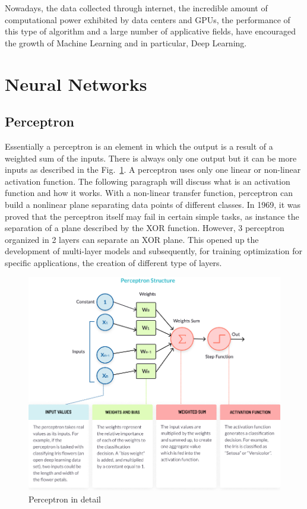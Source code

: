 \documentclass[12pt]{report}
\begin{document}
Nowadays, the data collected through internet, the incredible amount of computational power exhibited
by data centers and GPUs, the performance of this type of algorithm and a large number of applicative fields,
have encouraged the growth of Machine Learning and in particular, Deep Learning. 


\section{Neural Networks}

\subsection{Perceptron}

Essentially a perceptron is an element in which the output is a result of a weighted sum
of the inputs. There is always only one output but it can be more inputs as described in the Fig.~\ref{fig:perceptron}. 
A perceptron uses only one linear or non-linear activation function. The following paragraph will discuss what is an activation function and how it works.
With a non-linear transfer function, perceptron can build a nonlinear plane separating data points of different classes.
In 1969, it was proved that the perceptron itself may fail in certain simple tasks, as instance
the separation of a plane described by the XOR function. 
However, 3 perceptron organized in 2 layers can separate an XOR plane.
This opened up the development of multi-layer models and subsequently, for training optimization for specific
applications, the creation of different type of layers.

\begin{figure}[t]
    \centering
    \includegraphics[width=\textwidth]{perceptron-structure.png}
    \caption{Perceptron in detail \cite{percepimage}}
    \label{fig:perceptron}
\end{figure}
\end{document}
